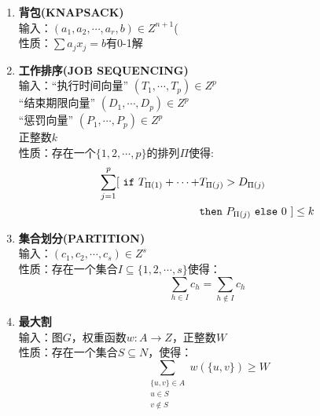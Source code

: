 \documentclass[twocolumn]{article}
\theoremstyle{nonumberplain}%
\begin{document}
\begin{enumerate}
    \item {\bf 背包(KNAPSACK)}\\
    输入：$(a_1,a_2,\cdots,a_r,b)\in Z^{n+1}$(\\
    性质：$\sum a_j x_j=b$有0-1解

    \item {\bf 工作排序(JOB SEQUENCING)}\\
    输入：“执行时间向量” $(T_1,\cdots,T_p)\in Z^p$\\
    \hphantom{输入：}“结束期限向量” $(D_1,\cdots,D_p)\in Z^p$\\
    \hphantom{输入：}“惩罚向量” $(P_1,\cdots,P_p)\in Z^p$\\
    \hphantom{输入：}正整数$k$\\
    性质：存在一个$\{1,2,\cdots,p\}$的排列$\Pi$使得:
    \begin{equation}\nonumber
        \begin{aligned}
            \sum_{j=1}^{p} [ \ {\tt if}\  T_{\Pi(1)}+\cdots+&T_{\Pi(j)} > D_{\Pi(j)} \\
                            & {\tt then} \  P_{\Pi(j)}\ {\tt else}\  0 \  ] \leq k
        \end{aligned}
    \end{equation}

    \item {\bf 集合划分(PARTITION)}\\
    输入：$(c_1,c_2,\cdots,c_s)\in Z^s$\\
    性质：存在一个集合$I\subseteq\{1,2,\cdots,s\}$使得：
    $$\sum_{h\in I}c_h = \sum_{h\notin I}c_h$$

    \item {\bf 最大割}\\
    输入：图$G$，权重函数$w:A\rightarrow Z$，正整数$W$\\
    性质：存在一个集合$S\subseteq N$，使得：
    $$\sum_{\substack{\{u,v\}\in A \\ u\in S \\ v\notin S}} w(\{u,v\})\ge W$$

    \end{enumerate}
\end{document}
